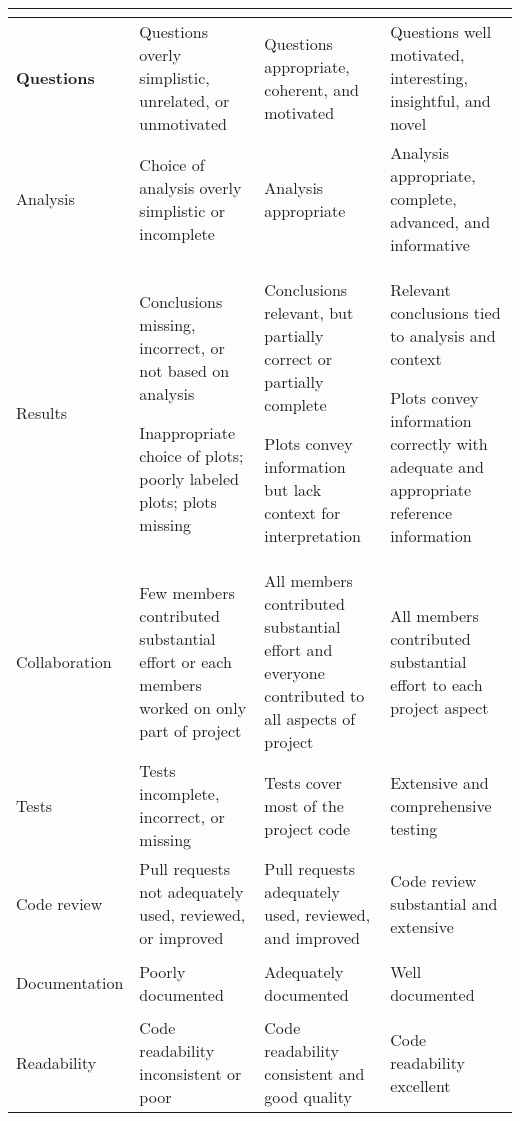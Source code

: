 \begin{tabular}{|>{\bf}l|>{\raggedright}p{4cm}|>{\raggedright}p{4cm}|>{\raggedright\arraybackslash}p{4cm}|}
\hline
 & 
\multicolumn{1}{c|}{\textbf{\ding{51}-}}
 & 
\multicolumn{1}{c|}{\textbf{\ding{51}}}
 & 
\multicolumn{1}{c|}{\textbf{\ding{51}+}}
 \\
\hline

Questions
 & 
Questions overly simplistic, unrelated, or unmotivated
 & 
Questions appropriate, coherent, and motivated
 & 
Questions well motivated, interesting, insightful, and novel
 \\
\hline

Analysis
 & 
Choice of analysis overly simplistic or incomplete
 & 
Analysis appropriate
 & 
Analysis appropriate, complete, advanced, and informative
 \\
\hline

Results
 & 
Conclusions missing, incorrect, or not based on analysis

Inappropriate choice of plots; poorly labeled plots; plots missing
 & 
Conclusions relevant, but partially correct or partially complete

Plots convey information but lack context for interpretation
 & 
Relevant conclusions tied to analysis and context

Plots convey information correctly with adequate and appropriate reference information
 \\
\hline

Collaboration
 & 
Few members contributed substantial effort or each members worked on only part of project
 & 
All members contributed substantial effort and everyone contributed to all aspects of project
 & 
All members contributed substantial effort to each project aspect
 \\
\hline

Tests
 & 
Tests incomplete, incorrect, or missing
 & 
Tests cover most of the project code
 & 
Extensive and comprehensive testing
 \\
\hline

Code review
 & 
Pull requests not adequately used, reviewed, or improved
 & 
Pull requests adequately used, reviewed, and improved
 & 
Code review substantial and extensive
 \\
\hline

Documentation
 & 
Poorly documented
 & 
Adequately documented
 & 
Well documented
 \\
\hline

Readability
 & 
Code readability inconsistent or poor
 & 
Code readability consistent and good quality
 & 
Code readability excellent
 \\
\hline


\end{tabular}
